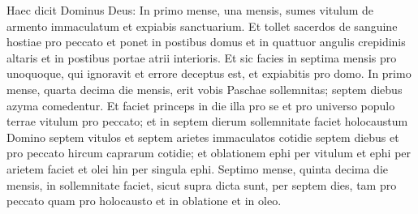 \begin{biblechapter}
\verse Haec dicit Dominus Deus: In primo mense, una mensis, sumes vitulum de armento immaculatum et expiabis sanctuarium. 
\verse Et tollet sacerdos de sanguine hostiae pro peccato et ponet in postibus domus et in quattuor angulis crepidinis altaris et in postibus portae atrii interioris. 
\verse Et sic facies in septima mensis pro unoquoque, qui ignoravit et errore deceptus est, et expiabitis pro domo. 
\verse In primo mense, quarta decima die mensis, erit vobis Paschae sollemnitas; septem diebus azyma comedentur. 
\verse Et faciet princeps in die illa pro se et pro universo populo terrae vitulum pro peccato; 
\verse et in septem dierum sollemnitate faciet holocaustum Domino septem vitulos et septem arietes immaculatos cotidie septem diebus et pro peccato hircum caprarum cotidie; 
\verse et oblationem ephi per vitulum et ephi per arietem faciet et olei hin per singula ephi. 
\verse Septimo mense, quinta decima die mensis, in sollemnitate faciet, sicut supra dicta sunt, per septem dies, tam pro peccato quam pro holocausto et in oblatione et in oleo. 
\end{biblechapter}

